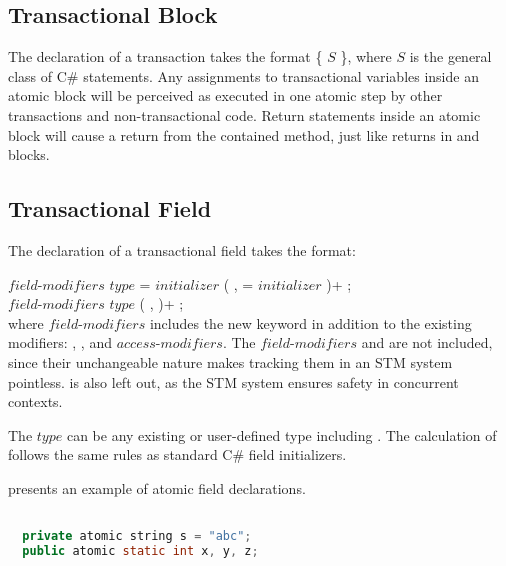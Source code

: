 \subsection{Transactional Block}
\label{subsec:design_atomic_block}
The declaration of a transaction takes the format  \{ $S$ \}, where $S$ is the general class of C\# statements. Any assignments to transactional variables inside an atomic block will be perceived as executed in one atomic step by other transactions and non-transactional code. Return statements inside an atomic block will cause a return from the contained method, just like returns in  and  blocks. 
\subsection{Transactional Field}\label{subsec:design_trans_field}
The declaration of a transactional field takes the format:

$field$-$modifiers$ $type$  = $initializer$ ( ,  = $initializer$ )+ ; \\
$field$-$modifiers$ $type$  ( ,  )+ ; \\

where $field$-$modifiers$ includes the new  keyword in addition to the existing modifiers: , , and $access$-$modifiers$\cite[p. 36]{sestoft2011c}. The $field$-$modifiers$  and  are not included, since their unchangeable nature makes tracking them in an \ac{STM} system pointless.  is also left out, as the \ac{STM} system ensures safety in concurrent contexts.

The $type$ can be any existing or user-defined type including . The calculation of  follows the same rules as standard C\# field initializers\cite[p. 40]{sestoft2011c}. 

 presents an example of atomic field declarations.

\begin{lstlisting}[label=lst:design_transactional_fields,
  caption={Local Transactional Variable},
  language=Java,  
  showspaces=false,
  showtabs=false,
  breaklines=true,
  showstringspaces=false,
  breakatwhitespace=true,
  commentstyle=\color{greencomments},
  keywordstyle=\color{bluekeywords},
  stringstyle=\color{redstrings},
  morekeywords={atomic, retry, orElse, var, get, set}]  % Start your code-block

  private atomic string s = "abc";
  public atomic static int x, y, z;
\end{lstlisting}

